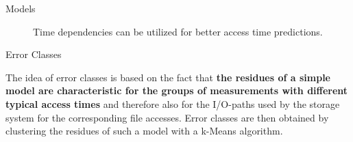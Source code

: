 \documentclass[final]{beamer}
\newlength{\onecolwid}
\begin{document}
\begin{frame}[t]
\begin{columns}[t]
\begin{column}{\onecolwid}
\begin{block}{Models}
	\begin{figure}
		\hfill
		\caption{Time dependencies can be utilized for better access time predictions.}
		\label{time_dep}
	\end{figure} 
	
	
\end{block}

\vspace*{-2cm}
\begin{block}{Error Classes}
	
The idea of error classes is based on the fact that \textbf{the residues of a simple model are characteristic for the groups of measurements with different typical access times} and therefore also for the I/O-paths used by the storage system for the corresponding file accesses. 
Error classes are then obtained by clustering the residues of such a model with a k-Means algorithm.


\end{block}
\end{column}
\end{columns}
\end{frame}
\end{document}
